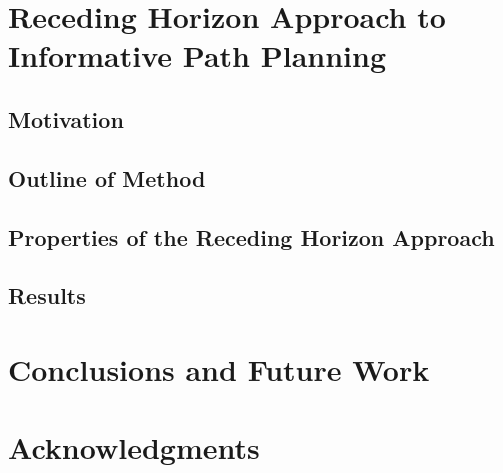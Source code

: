 \documentclass{article}
\begin{document}
		

					
\section{Receding Horizon Approach to Informative Path Planning}
\label{Section:RecedingHorizonApproach}

	\subsection{Motivation}
	
	\subsection{Outline of Method}
	
	\subsection{Properties of the Receding Horizon Approach}
	
	\subsection{Results}
	
\section{Conclusions and Future Work}
\label{Section:Conclusion}

\section*{Acknowledgments}


%
%



\end{document}
